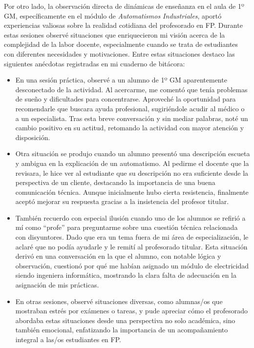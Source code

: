 Por otro lado, la observación directa de dinámicas de enseñanza en el aula de 1º GM, específicamente en el módulo de \textit{Automatismos Industriales}, aportó experiencias valiosas sobre la realidad cotidiana del profesorado en FP. Durante estas sesiones observé situaciones que enriquecieron mi visión acerca de la complejidad de la labor docente, especialmente cuando se trata de estudiantes con diferentes necesidades y motivaciones. Entre estas situaciones destaco las siguientes anécdotas registradas en mi cuaderno de bitácora:

\begin{itemize} %
    \item En una sesión práctica, observé a un alumno de 1º GM aparentemente desconectado de la actividad. Al acercarme, me comentó que tenía problemas de sueño y dificultades para concentrarse. Aproveché la oportunidad para recomendarle que buscara ayuda profesional, sugiriéndole acudir al médico o a un especialista. Tras esta breve conversación y sin mediar palabras, noté un cambio positivo en su actitud, retomando la actividad con mayor atención y disposición.
    
    \item Otra situación se produjo cuando un alumno presentó una descripción escueta y ambigua en la explicación de un automatismo. Al pedirme el docente que la revisara, le hice ver al estudiante que su descripción no era suficiente desde la perspectiva de un cliente, destacando la importancia de una buena comunicación técnica. Aunque inicialmente hubo cierta resistencia, finalmente aceptó mejorar su respuesta gracias a la insistencia del profesor titular.
    
    \item También recuerdo con especial ilusión cuando uno de los alumnos se refirió a mí como ``profe'' para preguntarme sobre una cuestión técnica relacionada con disyuntores. Dado que era un tema fuera de mi área de especialización, le aclaré que no podía ayudarle y le remití al profesorado titular. Esta situación derivó en una conversación en la que el alumno, con notable lógica y observación, cuestionó por qué me habían asignado un módulo de electricidad siendo ingeniera informática, mostrando la clara falta de adecuación en la asignación de mis prácticas.
    
    \item En otras sesiones, observé situaciones diversas, como alumnas/os que mostraban estrés por exámenes o tareas, y pude apreciar cómo el profesorado abordaba estas situaciones desde una perspectiva no solo académica, sino también emocional, enfatizando la importancia de un acompañamiento integral a las/os estudiantes en FP.
\end{itemize}

